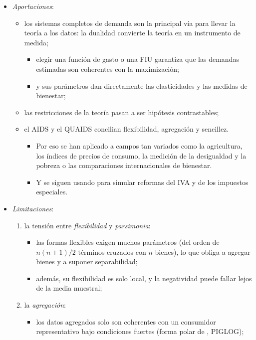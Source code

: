 \documentclass[11pt]{article}
\begin{document}
\begin{itemize}
\item \emph{Aportaciones}:
  \begin{itemize}
  \item los sistemas completos de demanda son la principal vía para llevar la teoría a los datos: la dualidad convierte la teoría en un instrumento de medida;
    \begin{itemize}
    \item elegir una función de gasto o una FIU garantiza que las demandas estimadas son coherentes con la maximización;
    \item y sus parámetros dan directamente las elasticidades y las medidas de bienestar;
    \end{itemize}
  \item las restricciones de la teoría pasan a ser hipótesis contrastables;
  \item el AIDS y el QUAIDS concilian flexibilidad, agregación y sencillez.
    \begin{itemize}
    \item Por eso se han aplicado a campos tan variados como la agricultura, los índices de precios de consumo, la medición de la desigualdad y la pobreza o las comparaciones internacionales de bienestar.
    \item Y se siguen usando para simular reformas del IVA y de los impuestos especiales\nocite{Deaton1997Analysis}.
    \end{itemize}
  \end{itemize}
\item \emph{Limitaciones}:
  \begin{enumerate}
  \item la tensión entre \emph{flexibilidad} y \emph{parsimonia}:
    \begin{itemize}
    \item las formas flexibles exigen muchos parámetros (del orden de $n(n+1)/2$ términos cruzados con $n$ bienes), lo que obliga a agregar bienes y a suponer separabilidad;
    \item además, su flexibilidad es solo local, y la negatividad puede fallar lejos de la media muestral;
    \end{itemize}
  \item la \emph{agregación}:
    \begin{itemize}
    \item los datos agregados solo son coherentes con un consumidor representativo bajo condiciones fuertes (forma polar de , PIGLOG);

\end{itemize}
\end{enumerate}
\end{itemize}
\end{document}
